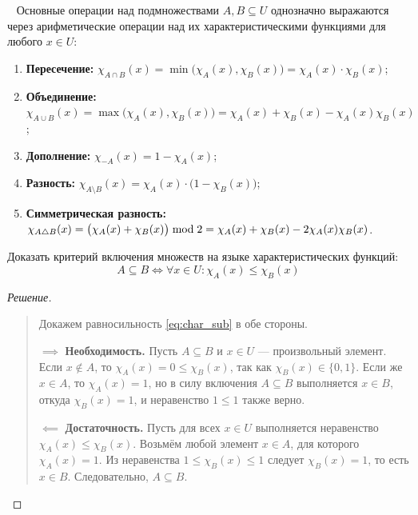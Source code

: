 \begin{properties} ~
    Основные операции над подмножествами $A, B \subseteq U$ однозначно 
    выражаются через арифметические операции над их характеристическими 
    функциями для любого $x \in U$:
    \begin{enumerate}
        \item \textbf{Пересечение:} 
        $\chi_{A \cap B}(x) = \min\bigl(\chi_A(x), \chi_B(x)\bigr) = 
        \chi_A(x) \cdot \chi_B(x)$;
        \item \textbf{Объединение:} 
        $\chi_{A \cup B}(x) = \max\bigl(\chi_A(x), \chi_B(x)\bigr) = 
        \chi_A(x) + \chi_B(x) - \chi_A(x) \chi_B(x)$;
        \item \textbf{Дополнение:} 
        $\chi_{-A}(x) = 1 - \chi_A(x)$;
        \item \textbf{Разность:} 
        $\chi_{A \setminus B}(x) = \chi_A(x) \cdot \bigl(1 - \chi_B(x)\bigr)$;
        \item \textbf{Симметрическая разность:} 
        $\chi_{A \mathbin{\triangle} B}(x) = \bigl(\chi_A(x) + \chi_B(x)\bigr) \bmod 2 = 
        \chi_A(x) + \chi_B(x) - 2\chi_A(x)\chi_B(x)$.
    \end{enumerate}
\end{properties}

\begin{problem}
    Доказать критерий включения множеств на языке характеристических 
    функций:
    \begin{equation} \label{eq:char_sub}
        A \subseteq B \iff \forall x \in U : \chi_A(x) \le \chi_B(x) \tag{8}
    \end{equation}
\end{problem}

\begin{proof}[Решение]~\\
    \begin{quote}
        Докажем равносильность \eqref{eq:char_sub} в обе стороны.

        $\implies$ \textbf{Необходимость.} Пусть $A \subseteq B$ и 
        $x \in U$ --- произвольный элемент. Если $x \notin A$, то 
        $\chi_A(x) = 0 \le \chi_B(x)$, так как $\chi_B(x) \in \{0, 1\}$. 
        Если же $x \in A$, то $\chi_A(x) = 1$, но в силу включения 
        $A \subseteq B$ выполняется $x \in B$, откуда $\chi_B(x) = 1$, и 
        неравенство $1 \le 1$ также верно.

        $\impliedby$ \textbf{Достаточность.} Пусть для всех $x \in U$ 
        выполняется неравенство $\chi_A(x) \le \chi_B(x)$. Возьмём любой 
        элемент $x \in A$, для которого $\chi_A(x) = 1$. Из неравенства 
        $1 \le \chi_B(x) \le 1$ следует $\chi_B(x) = 1$, то есть $x \in B$. 
        Следовательно, $A \subseteq B$.
    \end{quote}
\end{proof}

